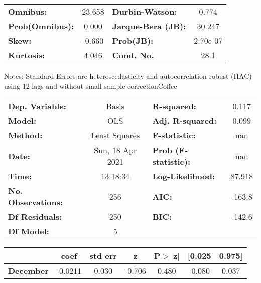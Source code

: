 \begin{center}
\begin{tabular}{lcccccc}
\bottomrule
\end{tabular}
\begin{tabular}{lclc}
\textbf{Omnibus:}       & 23.658 & \textbf{  Durbin-Watson:     } &    0.774  \\
\textbf{Prob(Omnibus):} &  0.000 & \textbf{  Jarque-Bera (JB):  } &   30.247  \\
\textbf{Skew:}          & -0.660 & \textbf{  Prob(JB):          } & 2.70e-07  \\
\textbf{Kurtosis:}      &  4.046 & \textbf{  Cond. No.          } &     28.1  \\
\bottomrule
\end{tabular}
\end{center}

Notes: \newline
 [1] Standard Errors are heteroscedasticity and autocorrelation robust (HAC) using 12 lags and without small sample correctionCoffee\begin{center}
\begin{tabular}{lclc}
\toprule
\textbf{Dep. Variable:}    &      Basis       & \textbf{  R-squared:         } &     0.117   \\
\textbf{Model:}            &       OLS        & \textbf{  Adj. R-squared:    } &     0.099   \\
\textbf{Method:}           &  Least Squares   & \textbf{  F-statistic:       } &       nan   \\
\textbf{Date:}             & Sun, 18 Apr 2021 & \textbf{  Prob (F-statistic):} &      nan    \\
\textbf{Time:}             &     13:18:34     & \textbf{  Log-Likelihood:    } &    87.918   \\
\textbf{No. Observations:} &         256      & \textbf{  AIC:               } &    -163.8   \\
\textbf{Df Residuals:}     &         250      & \textbf{  BIC:               } &    -142.6   \\
\textbf{Df Model:}         &           5      & \textbf{                     } &             \\
\bottomrule
\end{tabular}
\begin{tabular}{lcccccc}
                  & \textbf{coef} & \textbf{std err} & \textbf{z} & \textbf{P$> |$z$|$} & \textbf{[0.025} & \textbf{0.975]}  \\
\midrule
\textbf{December} &      -0.0211  &        0.030     &    -0.706  &         0.480        &       -0.080    &        0.037     \\

\end{tabular}
\end{center}
